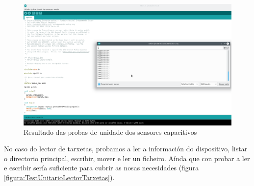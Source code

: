   \begin{figure}[htbp]
   \centering
   \includegraphics[scale=0.5,angle=90,keepaspectratio=true]{./imagenes/resultado-test-sensores-capacitivos.png}
   \caption{Resultado das probas de unidade dos sensores capacitivos}
   \label{figura:ResultadoTestUnitarioSensoresCapacitivos}
  \end{figure}
  
  No caso do lector de tarxetas, probamos a ler a información do dispositivo,
  listar o directorio principal, escribir, mover e ler un ficheiro. Aínda que
  con probar a ler e escribir sería suficiente para cubrir as nosas necesidades
  (figura \ref{figura:TestUnitarioLectorTarxetas}). \\
  
